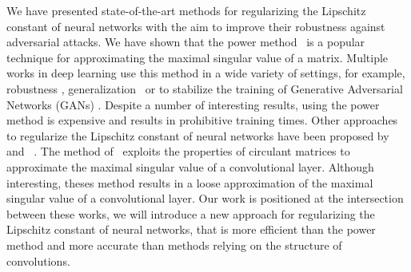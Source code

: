 We have presented state-of-the-art methods for regularizing the Lipschitz constant of neural networks with the aim to improve their robustness against adversarial attacks.
We have shown that the power method~\cite{golub2000eigenvalue} is a popular technique for approximating the maximal singular value of a matrix.
Multiple works in deep learning use this method in a wide variety of settings, for example, robustness \cite{farnia2018generalizable,tsuzuku2018lipschitz}, generalization~\cite{yoshida2017spectral,gouk2018regularisation} or to stabilize the training of Generative Adversarial Networks (GANs) \cite{miyato2018spectral}.
Despite a number of interesting results, using the power method is expensive and results in prohibitive training times. 
Other approaches to regularize the Lipschitz constant of neural networks have been proposed by~\citet{sedghi2018singular} and ~\citet{singla2019bounding}.
The method of~\citet{sedghi2018singular,singla2019bounding} exploits the properties of circulant matrices to approximate the maximal singular value of a convolutional layer.
Although interesting, theses method results in a loose approximation of the maximal singular value of a convolutional layer.
Our work is positioned at the intersection between these works, we will introduce a new approach for regularizing the Lipschitz constant of neural networks, that is more efficient than the power method and more accurate than methods relying on the structure of convolutions.






%

